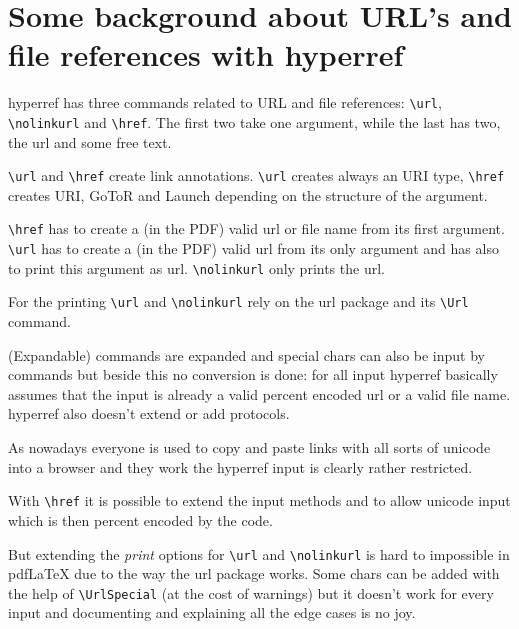 \documentclass{article}
\newcommand\cs[1]{\texttt{\textbackslash #1}}
\begin{document}
%
%
%

%
\section{Some background about URL's and file references with hyperref}

hyperref has three commands related to URL and file references: \cs{url},
\cs{nolinkurl} and \cs{href}. The first two take one argument,
while the last has two, the url and some free text.


\cs{url} and \cs{href} create link annotations. \cs{url} creates always an URI
type, \cs{href} creates URI, GoToR and Launch depending on the structure of the argument.

\cs{href} has to create a (in the PDF) valid url or file name from its first argument.
\cs{url} has to create a (in the PDF) valid url from its only argument and has also to print
this argument as url. \cs{nolinkurl} only prints the url.

For the printing \cs{url} and \cs{nolinkurl} rely on the url package and its \cs{Url} command.

(Expandable) commands are expanded and special chars can also be input by commands but 
beside this no conversion is done: for all input hyperref basically assumes that 
the input is already a valid percent encoded url or a valid file name. hyperref also
doesn't extend or add protocols.

As nowadays everyone is used to copy and paste links with all sorts of unicode into a browser and
they work the hyperref input is clearly rather restricted. 


With \cs{href} it is possible to extend the input methods and to allow unicode input which is then
percent encoded by the code. 

But extending the \emph{print} options for \cs{url} and \cs{nolinkurl}
is hard to impossible in pdf\LaTeX{} due to the way the url package works. 
Some chars can be added with the help of \cs{UrlSpecial} (at the cost of warnings)
but it doesn't work for every input and documenting and explaining all the edge cases is no joy.
\end{document}
